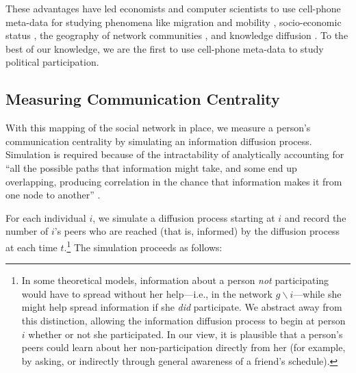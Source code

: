 \documentclass[12pt]{article}
\begin{document}
These advantages have led economists and computer scientists to use cell-phone meta-data for studying phenomena like migration and mobility \citep{Anonymous:I3oZTQ6n,Wesolowski:2012jh}, socio-economic status \citep{Blumenstock:2015hq}, the geography of network communities \citep{Blondel:2010ip,Barthelemy:2011dq}, and knowledge diffusion \citep{Bjorkegren:2015iy}. To the best of our knowledge, we are the first to use cell-phone meta-data to study political participation.

\subsection{Measuring Communication Centrality}\label{sec:larsonmeasure}

With this mapping of the social network in place, we measure a person's communication centrality by simulating an information diffusion process. Simulation is required because of the intractability of analytically accounting for ``all the possible paths that information might take, and some end up overlapping, producing correlation in the chance that information makes it from one node to another'' \citep[][8]{JacksonTypology}.

For each individual $i$, we simulate a diffusion process starting at $i$ and record the number of $i$'s peers who are reached (that is, informed) by the diffusion process at each time $t$.\footnote{In some theoretical models, information about a person \emph{not} participating would have to spread without her help---i.e., in the network $g\backslash i$---while she might help spread information if she \emph{did} participate. We abstract away from this distinction, allowing the information diffusion process to begin at person $i$ whether or not she participated. In our view, it is plausible that a person's peers could learn about her non-participation directly from her (for example, by asking, or indirectly through general awareness of a friend's schedule).} The simulation proceeds as follows:
\end{document}

